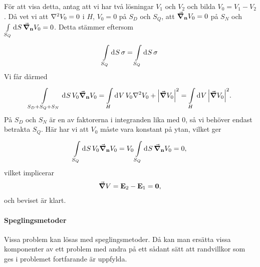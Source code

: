För att visa detta, antag att vi har två lösningar $V_{1}$ och $V_{2}$ och bilda $V_{0} = V_{1} - V_{2}$. Då vet vi att $\laplacian{V_{0}} = 0$ i $H$, $V_{0} = 0$ på $S_{D}$ och $S_{Q}$, att $\grad_{\vb{n}}{V_{0}} = 0$ på $S_{N}$ och $\int\limits_{S_{Q}}^{}\dd[]{S}\grad_{\vb{n}}{V_{0}} = 0$. Detta stämmer eftersom
\begin{align*}
	\int\limits_{S_{Q}}^{}\dd[]{S}\sigma = \int\limits_{S_{Q}}^{}\dd[]{S}\sigma
\end{align*}
Vi får därmed
\begin{align*}
	\integ{S_{D} + S_{Q} + S_{N}}{}{S}{V_{0}\grad_{\vb{n}}{V_{0}}} = \integ{H}{}{V}{V_{0}\laplacian{V_{0}} + \abs{\grad{V_{0}}}^{2}} = \integ{H}{}{V}{\abs{\grad{V_{0}}}^{2}}.
\end{align*}
På $S_{D}$ och $S_{N}$ är en av faktorerna i integranden lika med $0$, så vi behöver endast betrakta $S_{Q}$. Här har vi att $V_{0}$ måste vara konstant på ytan, vilket ger
\begin{align*}
	\int\limits_{S_{Q}}^{}\dd[]{S}V_{0}\grad_{\vb{n}}{V_{0}} = V_{0}\int\limits_{S_{Q}}^{}\dd[]{S}\grad_{\vb{n}}{V_{0}} = 0,
\end{align*}
vilket implicerar
\begin{align*}
	\grad{V} = \vb{E}_{2} - \vb{E}_{1} = \vb{0},
\end{align*}
och beviset är klart.

\paragraph{Speglingsmetoder}
Vissa problem kan lösas med speglingsmetoder. Då kan man ersätta vissa komponenter av ett problem med andra på ett sådant sätt att randvillkor som ges i problemet fortfarande är uppfylda.

